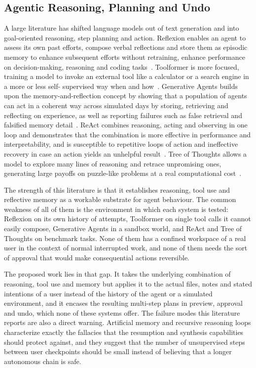 \documentclass{FastFyp}
\begin{document}
\subsection{Agentic Reasoning, Planning and Undo}
A large literature has shifted language models out of text generation and into goal-oriented reasoning, step planning and action. Reflexion enables an agent to assess its own past efforts, compose verbal reflections and store them as episodic memory to enhance subsequent efforts without retraining, enhance performance on decision-making, reasoning and coding tasks~\cite{ref:shinn2023}. Toolformer is more focused, training a model to invoke an external tool like a calculator or a search engine in a more or less self- supervised way when and how~\cite{ref:schick2023}. Generative Agents builds upon the memory-and-reflection concept by showing that a population of agents can act in a coherent way across simulated days by storing, retrieving and reflecting on experience, as well as reporting failures such as false retrieval and falsified memory detail~\cite{ref:park2023}. ReAct combines reasoning, acting and observing in one loop and demonstrates that the combination is more effective in performance and interpretability, and is susceptible to repetitive loops of action and ineffective recovery in case an action yields an unhelpful result~\cite{ref:yao2023react}. Tree of Thoughts allows a model to explore many lines of reasoning and retrace unpromising ones, generating large payoffs on puzzle-like problems at a real computational cost~\cite{ref:yao2023tot}.

The strength of this literature is that it establishes reasoning, tool use and reflective memory as a workable substrate for agent behaviour. The common weakness of all of them is the environment in which each system is tested: Reflexion on its own history of attempts, Toolformer on single tool calls it cannot easily compose, Generative Agents in a sandbox world, and ReAct and Tree of Thoughts on benchmark tasks. None of them has a confined workspace of a real user in the context of normal interrupted work, and none of them needs the sort of approval that would make consequential actions reversible.

The proposed work lies in that gap. It takes the underlying combination of reasoning, tool use and memory but applies it to the actual files, notes and stated intentions of a user instead of the history of the agent or a simulated environment, and it encases the resulting multi-step plans in preview, approval and undo, which none of these systems offer. The failure modes this literature reports are also a direct warning. Artificial memory and recursive reasoning loops characterize exactly the fallacies that the resumption and synthesis capabilities should protect against, and they suggest that the number of unsupervised steps between user checkpoints should be small instead of believing that a longer autonomous chain is safe.
\end{document}
